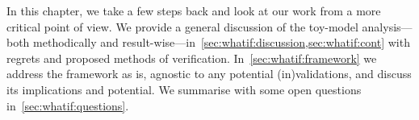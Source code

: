 





\newcommand\Ft{\ALIASFt}
\newcommand\ah{\ALIASah}
\newcommand\lcoord{\ALIASlcoord}
\newcommand\lcoordx{\ALIASlcoordx}
\newcommand\lcoordk{\ALIASlcoordk}
\newcommand\hpA{\ALIAShpA}
\newcommand\hpB{\ALIAShpB}
\newcommand\hpC{\ALIAShpC}
\newcommand\hpAB{\ALIAShpAB}
\newcommand\hpCR{\ALIAShpCR}
\newcommand\hpCI{\ALIAShpCI}
\newcommand\epsA{\ALIASepsA}
\newcommand\epsB{\ALIASepsB}
\newcommand\epsC{\ALIASepsC}
\newcommand\wallsep{\ALIASwallsep}









In this chapter, we take a few steps back and look at our work from a more critical point of view. 
We provide a general discussion of the toy-model analysis---both methodically and result-wise---in~\cref{sec:whatif:discussion,sec:whatif:cont} with regrets and proposed methods of verification. In~\cref{sec:whatif:framework} we address the framework as is, agnostic to any potential (in)validations, and discuss its implications and potential. We summarise with some open questions in~\cref{sec:whatif:questions}. 










